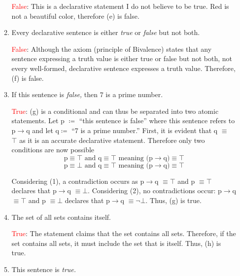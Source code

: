\documentclass{article}
\begin{document}
\begin{enumerate}
\begin{enumerate}
            \textcolor{red}{False}: This is a declarative statement I do not believe to be true. Red is not a beautiful color, therefore (e) is false.
\vspace{0.1in}
        \item Every declarative sentence is either \emph{true} or \emph{false} but not both.
            
            \textcolor{red}{False}: Although the axiom (principle of Bivalence) states that any sentence expressing a truth value is either true or false but not both, not every well-formed, declarative sentence expresses a truth value. Therefore, (f) is false.

\pagebreak
        \item If this sentence is \emph{false,} then $7$ is a prime number.

            \textcolor{red}{True}: (g) is a conditional and can thus be separated into two atomic statements. Let p $\coloneqq$ ``this sentence is false''  where this sentence refers to p$\rightarrow$q and let q$\coloneqq$ ``7 is a prime number.'' First, it is evident that q $\equiv$ $\top$ as it is an accurate declarative statement. Therefore only two conditions are now possible 
            \begin{equation}
                \text{p} \equiv \top \text{ and q} \equiv \top \text{ meaning (p}\rightarrow \text{q)} \equiv \top
            \end{equation}
            \begin{equation}
                \text{p} \equiv \bot \text{ and q} \equiv \top \text{ meaning (p}\rightarrow \text{q)} \equiv \top
            \end{equation}
            
            Considering (1), a contradiction occurs as p$\rightarrow$q $\equiv \top$ and p $\equiv \top$ declares that p$\rightarrow$q $\equiv \bot$. 
            Considering (2), no contradictions occur: p$\rightarrow$q $\equiv \top$ and p $\equiv \bot$ declares that p$\rightarrow$q $\equiv \neg \bot$. Thus, (g) is true.
\vspace{0.1in}
        \item The set of all sets contains itself.
        
            \textcolor{red}{True}: The statement claims that the set contains all sets. Therefore, if the set contains all sets, it must include the set that is itself. Thus, (h) is true. 
\vspace{0.1in}
        \item This sentence is \emph{true.}


\end{enumerate}
\end{enumerate}
\end{document}
